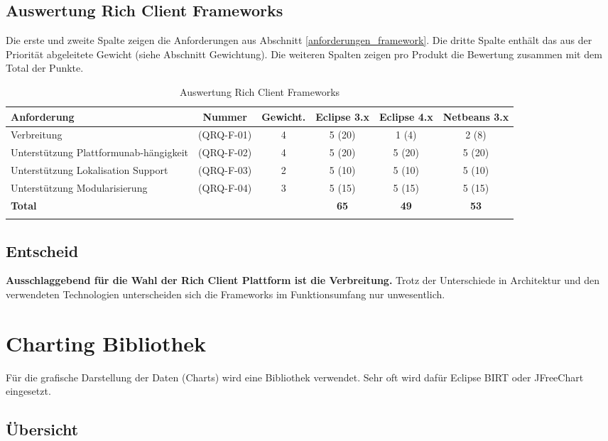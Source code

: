 \subsection{Auswertung Rich Client Frameworks}
Die erste und zweite Spalte zeigen die Anforderungen aus Abschnitt \ref{anforderungen_framework}. Die dritte Spalte enthält das aus der Priorität abgeleitete Gewicht (siehe Abschnitt Gewichtung). Die weiteren Spalten zeigen pro Produkt die Bewertung zusammen mit dem Total der Punkte.
\begin{longtable}{|p{3cm}|c|c|c|c|c|}\hline
 \textbf{Anforderung} & \textbf{Nummer} &  \textbf{Gewicht.} & \textbf{Eclipse 3.x} & \textbf{Eclipse 4.x} &  \textbf{Netbeans 3.x}\\\hline
   Verbreitung & (QRQ-F-01) & 4 & 5 (20) & 1 (4) & 2 (8)\\\hline
   Unterstützung Plattformunab-hängigkeit & (QRQ-F-02) & 4 & 5 (20) & 5 (20) & 5 (20)\\\hline
   Unterstützung Lokalisation Support & (QRQ-F-03) & 2 & 5 (10) & 5 (10) & 5 (10) \\\hline
   Unterstützung Modularisierung & (QRQ-F-04) & 3 & 5 (15) & 5 (15) & 5 (15) \\\hline
   \textbf{Total} & & & \textbf{65} & \textbf{49} & \textbf{53}\\\hline
    \caption{Auswertung Rich Client Frameworks}
\end{longtable}

\subsection{Entscheid}\label{rcp_entscheid}
\textbf{Ausschlaggebend für die Wahl der Rich Client Plattform ist die Verbreitung.} Trotz der Unterschiede in Architektur und den verwendeten Technologien unterscheiden sich die Frameworks im Funktionsumfang nur unwesentlich.


\section{Charting Bibliothek}
Für die grafische Darstellung der Daten (Charts) wird eine Bibliothek verwendet. Sehr oft wird dafür Eclipse BIRT oder JFreeChart eingesetzt.
\subsection{Übersicht}
